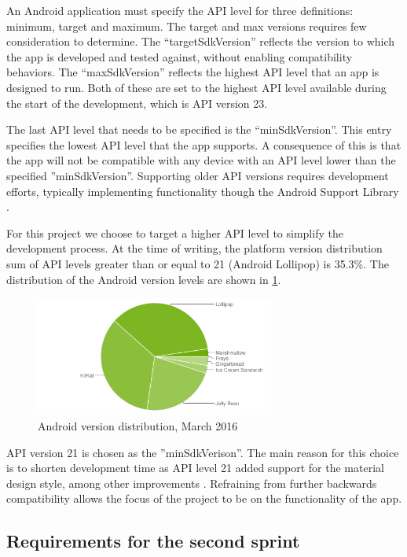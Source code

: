 An Android application must specify the API level for three definitions: minimum, target and maximum.
The target and max versions requires few consideration to determine.
The ``targetSdkVersion'' reflects the version to which the app is developed and tested against, without enabling compatibility behaviors.
The ``maxSdkVersion'' reflects the highest API level that an app is designed to run.
Both of these are set to the highest API level available during the start of the development, which is API version 23.

The last API level that needs to be specified is the ``minSdkVersion''.
This entry specifies the lowest API level that the app supports.
A consequence of this is that the app will not be compatible with any device with an API level lower than the specified ''minSdkVersion''.
Supporting older API versions requires development efforts, typically implementing functionality though the Android Support Library \cite{androidSL}.

For this project we choose to target a higher API level to simplify the development process.
At the time of writing, the platform version distribution sum of API levels greater than or equal to 21 (Android Lollipop) is 35.3\%.
The distribution of the Android version levels are shown in \ref{fig:dashboard}.

\begin{figure}[h]
	\begin{center}
	\includegraphics[width=0.7\textwidth]{figures/android-chart-march.png}
	\end{center}
	\caption{Android version distribution, March 2016 \cite{androidDashboard}}
	\label{fig:dashboard}
\end{figure}

API version 21 is chosen as the ''minSdkVerison''. 
The main reason for this choice is to shorten development time as API level 21 added support for the material design style, among other improvements \cite{android5API}. 
Refraining from further backwards compatibility allows the focus of the project to be on the functionality of the app. 






\subsection{Requirements for the second sprint}
